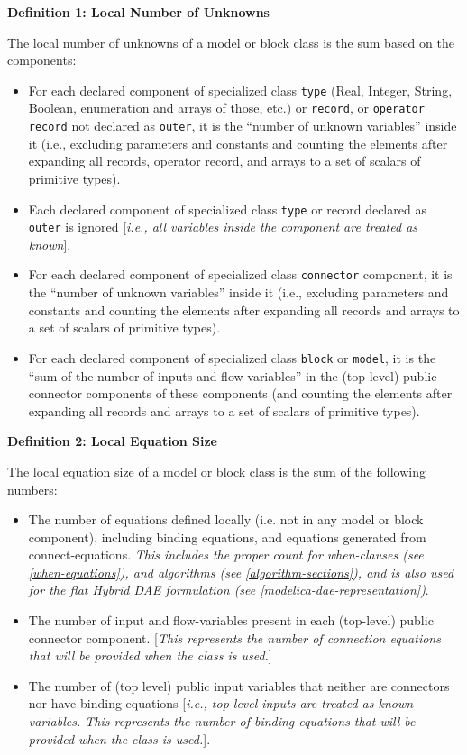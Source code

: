 \textbf{Definition 1: Local Number of Unknowns}

The local number of unknowns of a model or block class is the sum based
on the components:

\begin{itemize}
\item
  For each declared component of specialized class \lstinline!type! (Real, Integer,
  String, Boolean, enumeration and arrays of those, etc.) or \lstinline!record!, or
  \lstinline!operator record! not declared as \lstinline!outer!, it is the ``number of unknown
  variables'' inside it (i.e., excluding parameters and constants and
  counting the elements after expanding all records, operator record,
  and arrays to a set of scalars of primitive types).
\item
  Each declared component of specialized class \lstinline!type! or record declared
  as \lstinline!outer! is ignored {[}\emph{i.e., all variables inside the component
  are treated as known}{]}.
\item
  For each declared component of specialized class \lstinline!connector! component,
  it is the ``number of unknown variables'' inside it (i.e., excluding
  parameters and constants and counting the elements after expanding all
  records and arrays to a set of scalars of primitive types).
\item
  For each declared component of specialized class \lstinline!block! or \lstinline!model!, it is
  the ``sum of the number of inputs and flow variables'' in the (top
  level) public connector components of these components (and counting
  the elements after expanding all records and arrays to a set of
  scalars of primitive types).
\end{itemize}

\textbf{Definition 2: Local Equation Size}

The local equation size of a model or block class is the sum of the
following numbers:

\begin{itemize}
\item
  The number of equations defined locally (i.e. not in any model or
  block component), including binding equations, and equations generated
  from connect-equations. \emph{This includes the proper count for
  when-clauses (see \autoref{when-equations}), and algorithms (see \autoref{algorithm-sections}),
  and is also used for the flat Hybrid DAE formulation
  (see \autoref{modelica-dae-representation})}.
\item
  The number of input and flow-variables present in each (top-level)
  public connector component. {[}\emph{This represents the number of
  connection equations that will be provided when the class is used.}{]}
\item
  The number of (top level) public input variables that neither are
  connectors nor have binding equations {[}\emph{i.e., top-level inputs
  are treated as known variables. This represents the number of binding
  equations that will be provided when the class is used.}{]}.
\end{itemize}


